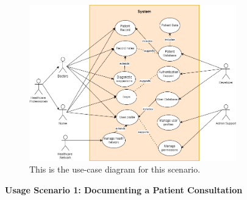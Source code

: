 \documentclass[12pt]{article}
\begin{document}
\begin{figure}[h]
  \centering
  \includegraphics[width=0.8\textwidth]{use-case.drawio.png}
  \caption{This is the use-case diagram for this scenario.}
  \label{fig:Use-Case Diagram}
\end{figure}

\textbf{Usage Scenario 1: Documenting a Patient Consultation}
\end{document}
